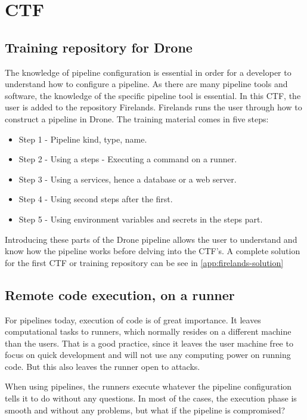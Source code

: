 \section{\ac{CTF}}
\label{sec:ctf}

\subsection{Training repository for Drone}
The knowledge of pipeline configuration is essential in order for a developer to understand how to configure a pipeline.
As there are many pipeline tools and software, the knowledge of the specific pipeline tool is essential.
In this CTF, the user is added to the repository Firelands.
Firelands runs the user through how to construct a pipeline in Drone. The training material comes in five steps:
\begin{itemize}
    \item Step 1 - Pipeline kind, type, name.
    \item Step 2 - Using a steps - Executing a command on a runner.
    \item Step 3 - Using a services, hence a database or a web server.
    \item Step 4 - Using second steps after the first.
    \item Step 5 - Using environment variables and secrets in the steps part.
\end{itemize}

Introducing these parts of the Drone pipeline allows the user to understand and know how 
the pipeline works before delving into the CTF's. A complete solution for the first CTF or training repository can 
be see in \ref{app:firelands-solution}

\subsection{Remote code execution, on a runner}
For pipelines today, execution of code is of great importance. It leaves computational tasks to runners, which normally resides 
on a different machine than the users. That is a good practice, since it leaves the user machine free to focus on quick
development and will not use any computing power on running code. But this also leaves the runner open to attacks.

When using pipelines, the runners execute whatever the pipeline configuration tells it to do without any questions.
In most of the cases, the execution phase is smooth and without any problems, but what if the pipeline is compromised?

